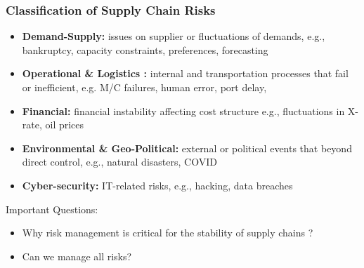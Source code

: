\documentclass[10pt,presentation]{beamer}
\begin{document}
\begin{frame}
  \frametitle{Classification of Supply Chain Risks}

  \begin{itemize}
    \item \textbf{Demand-Supply:} issues on supplier or fluctuations of demands, e.g., bankruptcy, capacity constraints, preferences, forecasting
    \item \textbf{Operational \& Logistics :} \alert{internal} and transportation \alert{processes} that fail or inefficient, e.g. M/C failures, human error, port delay,
    \item \textbf{Financial:} financial instability affecting cost structure e.g., fluctuations in X-rate, oil prices
    \item \textbf{Environmental \& Geo-Political:}  \alert{external} or political events that beyond direct control, e.g., natural disasters, COVID
    \item \textbf{Cyber-security:} IT-related risks, e.g., hacking, data breaches
  \end{itemize}

  \NextLine
  \begin{block}{\small{Important Questions:} } \small{
    \begin{itemize}
      \item Why risk management is critical for the stability of supply chains ?
      \item Can we manage all risks?
    \end{itemize} }
  \end{block}


\end{frame}
\end{document}
